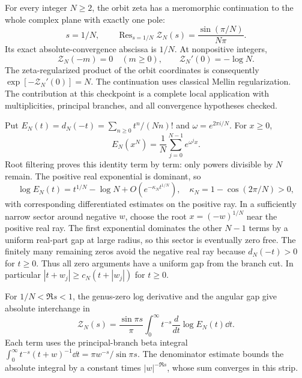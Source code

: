 For every integer $N\ge2$, the orbit zeta has a meromorphic continuation to
the whole complex plane with exactly one pole:
\[
\boxed{s=1/N,\qquad
\operatorname{Res}_{s=1/N}\mathcal Z_N(s)=\frac{\sin(\pi/N)}{N\pi}.}
\]
Its exact absolute-convergence abscissa is $1/N$. At nonpositive integers,
\[
\boxed{\mathcal Z_N(-m)=0\quad(m\ge0),\qquad
\mathcal Z_N'(0)=-\log N.}
\]
The zeta-regularized product of the orbit coordinates is consequently
$\exp[-\mathcal Z_N'(0)]=N$.
The continuation uses classical Mellin regularization. The contribution at
this checkpoint is a complete local application with multiplicities,
principal branches, and all convergence hypotheses checked.

Put $E_N(t)=d_N(-t)=\sum_{n\ge0}t^n/(Nn)!$ and
$\omega=e^{2\pi i/N}$. For $x\ge0$,
\[
E_N(x^N)=\frac1N\sum_{j=0}^{N-1}e^{\omega^jx}.
\]
Root filtering proves this identity term by term: only powers divisible by
$N$ remain. The positive real exponential is dominant, so
\[
\log E_N(t)=t^{1/N}-\log N+O(e^{-\kappa_N t^{1/N}}),
\quad \kappa_N=1-\cos(2\pi/N)>0,
\]
with corresponding differentiated estimates on the positive ray.
In a sufficiently narrow sector around negative $w$, choose the root
$x=(-w)^{1/N}$ near the positive real ray. The first exponential dominates
the other $N-1$ terms by a uniform real-part gap at large radius, so this
sector is eventually zero free. The finitely many remaining zeros avoid
the negative real ray because $d_N(-t)>0$ for $t\ge0$.
Thus all zero arguments have a uniform gap from the branch cut.
In particular $|t+w_j|\ge c_N(t+|w_j|)$ for $t\ge0$.

For $1/N<\Re s<1$, the genus-zero log derivative and the angular gap give
absolute interchange in
\[
\mathcal Z_N(s)=\frac{\sin\pi s}{\pi}
\int_0^\infty t^{-s}\frac{d}{dt}\log E_N(t)\dd t.
\]
Each term uses the principal-branch beta integral
$\int_0^\infty t^{-s}(t+w)^{-1}\dd t=\pi w^{-s}/\sin\pi s$.
The denominator estimate bounds the absolute integral by a constant times
$|w|^{-\Re s}$, whose sum converges in this strip.

